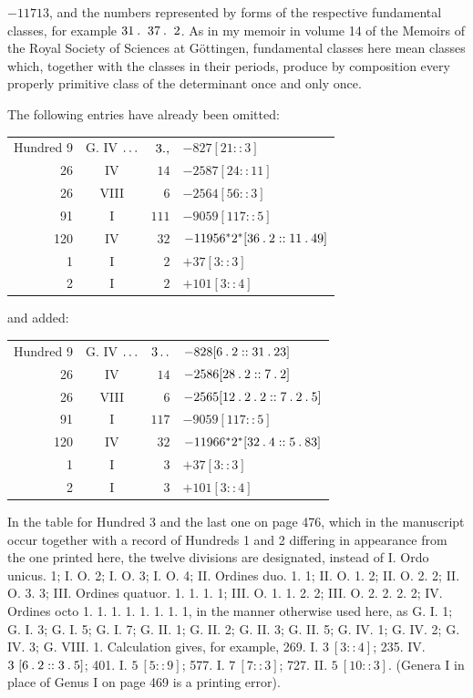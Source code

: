 $-11713$, and the numbers represented by forms of the respective fundamental classes, for example $31\pdot\ 37\pdot\ 2$. As in my memoir in volume 14 of the Memoirs of the Royal Society of Sciences at Göttingen, fundamental classes here mean classes which, together with the classes in their periods, produce by composition every properly primitive class of the determinant once and only once.
\par{}The following entries have already been omitted:
\begin{longtable}{rcrl}
Hundred 9 & G. IV $\mathinner{.\,.\,.}$ & $3\mathbin{.},$ & $-827[21::3]$ \\
26 & IV & $14$ & $-2587[24::11]$ \\
26 & VIII & $6$ & $-2564[56::3]$ \\
91 & I & $111$ & $-9059[117::5]$ \\
120 & IV & $32$ & $-11956{}^{*}2^{*}[36\mathbin{.}2::11\mathbin{.}49]$ \\
1 & I & $2$ & $+37[3::3]$ \\
2 & I & $2$ & $+101[3::4]$ \\
\end{longtable}
\par{}and added:
\begin{longtable}{rcrl}
Hundred 9 & G. IV $\mathinner{.\,.\,.}$ & $3\mathinner{.\,.}$ & $-828[6\mathbin{.}2::31\mathbin{.}23]$ \\
26 & IV & $14$ & $-2586[28\mathbin{.}2::7\mathbin{.}2]$ \\
26 & VIII & $6$ & $-2565[12\mathbin{.}2\mathbin{.}2::7\mathbin{.}2\mathbin{.}5]$ \\
91 & I & $117$ & $-9059[117::5]$ \\
120 & IV & $32$ & $-11966{}^{*}2^{*}[32\mathbin{.}4::5\mathbin{.}83]$ \\
1 & I & $3$ & $+37[3::3]$ \\
2 & I & $3$ & $+101[3::4]$ \\
\end{longtable}
\par In the table for Hundred 3 and the last one on page 476, which in the manuscript occur together with a record of Hundreds 1 and 2 differing in appearance from the one printed here, the twelve divisions are designated, instead of I. Ordo unicus. 1; I. O. 2; I. O. 3; I. O. 4; II. Ordines duo. 1. 1; II. O. 1. 2; II. O. 2. 2; II. O. 3. 3; III. Ordines quatuor. 1. 1. 1. 1; III. O. 1. 1. 2. 2; III. O. 2. 2. 2. 2; IV. Ordines octo 1. 1. 1. 1. 1. 1. 1. 1, in the manner otherwise used here, as G. I. 1; G. I. 3; G. I. 5; G. I. 7; G. II. 1; G. II. 2; G. II. 3; G. II. 5; G. IV. 1; G. IV. 2; G. IV. 3; G. VIII. 1. Calculation gives, for example, 269. I. $3\ [3::4]$; 235. IV. $3\ [6\mathbin{.}2::3\mathbin{.}5]$; 401. I. $5\ [5::9]$; 577. I. $7\ [7::3]$; 727. II. $5\ [10::3]$. (Genera I in place of Genus I on page 469 is a printing error).
